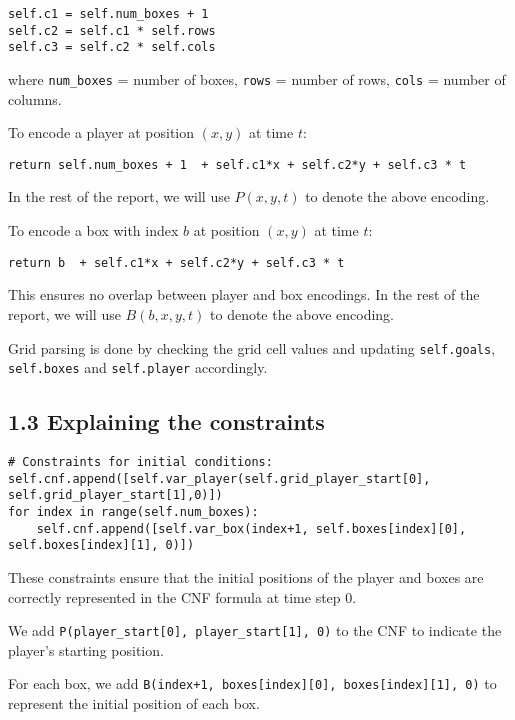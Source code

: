 \documentclass[12pt,a4paper]{article}
\begin{document}
\begin{lstlisting}
self.c1 = self.num_boxes + 1
self.c2 = self.c1 * self.rows
self.c3 = self.c2 * self.cols
\end{lstlisting}

where \texttt{num\_boxes} = number of boxes, \texttt{rows} = number of rows, \texttt{cols} = number of columns.

To encode a player at position \((x,y)\) at time \(t\):

\begin{lstlisting}
return self.num_boxes + 1  + self.c1*x + self.c2*y + self.c3 * t
\end{lstlisting}

In the rest of the report, we will use \(P(x,y,t)\) to denote the above encoding.

To encode a box with index \(b\) at position \((x,y)\) at time \(t\):

\begin{lstlisting}
return b  + self.c1*x + self.c2*y + self.c3 * t
\end{lstlisting}

This ensures no overlap between player and box encodings. In the rest of the report, we will use \(B(b,x,y,t)\) to denote the above encoding.

Grid parsing is done by checking the grid cell values and updating \texttt{self.goals}, \texttt{self.boxes} and \texttt{self.player} accordingly.
\newpage

\newpage

\subsection*{1.3 Explaining the constraints}

\begin{lstlisting}
# Constraints for initial conditions:
self.cnf.append([self.var_player(self.grid_player_start[0], self.grid_player_start[1],0)])
for index in range(self.num_boxes):
    self.cnf.append([self.var_box(index+1, self.boxes[index][0], self.boxes[index][1], 0)])
\end{lstlisting}

These constraints ensure that the initial positions of the player and boxes are correctly represented in the CNF formula at time step 0.  

We add \texttt{P(player\_start[0], player\_start[1], 0)} to the CNF to indicate the player's starting position.  

For each box, we add \texttt{B(index+1, boxes[index][0], boxes[index][1], 0)} to represent the initial position of each box.
\end{document}

